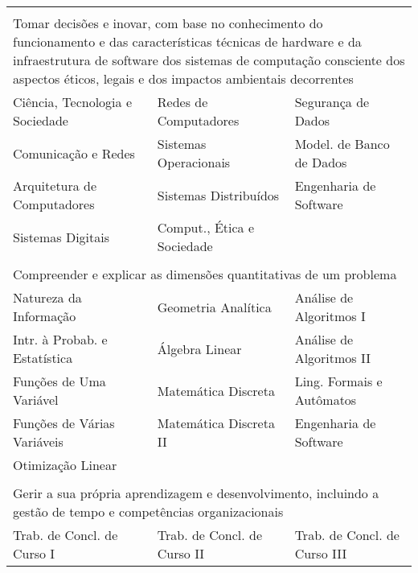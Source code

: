 \begin{longtable}{|p{}p{}p{}|}
    \multicolumn{3}{p{0.95\textwidth}}{}\\

    \multicolumn{3}{p{0.95\textwidth}}{Tomar decisões e inovar, com base no
    conhecimento do funcionamento e das características técnicas de hardware
    e da infraestrutura de software dos sistemas de computação consciente dos
    aspectos éticos, legais e dos impactos ambientais decorrentes}\\
    \hline
    \textcolor{nred}{Ciência, Tecnologia e Sociedade} &
    \textcolor{nblue}{Redes de Computadores} &
    \textcolor{nblue}{Segurança de Dados}\\
    \textcolor{nred}{Comunicação e Redes} &
    \textcolor{nblue}{Sistemas Operacionais} &
    \textcolor{nblue}{\small Model. de Banco de Dados}\\
    \textcolor{nblue}{Arquitetura de Computadores} &
    \textcolor{nblue}{Sistemas Distribuídos} &
    \textcolor{nblue}{Engenharia de Software} \\
    \textcolor{nblue}{Sistemas Digitais} &
    \textcolor{nblue}{Comput., Ética e Sociedade} & \\
    \hline
    
    \multicolumn{3}{p{0.95\textwidth}}{}\\
    \multicolumn{3}{p{0.95\textwidth}}{Compreender e explicar as dimensões quantitativas de um
    problema}\\
    \hline
    \textcolor{nred}{Natureza da Informação} &
    \textcolor{nred}{Geometria Analítica} &
    \textcolor{nblue}{Análise de Algoritmos I} \\
    \textcolor{nred}{Intr. à Probab. e Estatística} &
    \textcolor{nblue}{Álgebra Linear} &
    \textcolor{nblue}{Análise de Algoritmos II} \\
    \textcolor{nred}{Funções de Uma Variável} &
    \textcolor{nblue}{Matemática Discreta} &
    \textcolor{nblue}{Ling. Formais e Autômatos} \\
    \textcolor{nred}{Funções de Várias Variáveis} &
    \textcolor{nblue}{Matemática Discreta II} &
    \textcolor{nblue}{Engenharia de Software}\\
    \textcolor{nblue}{Otimização Linear} & & \\
    \hline
    
    \multicolumn{3}{p{0.95\textwidth}}{}\\
    \multicolumn{3}{p{0.95\textwidth}}{Gerir a sua própria aprendizagem e
    desenvolvimento, incluindo a gestão de tempo e competências
    organizacionais}\\
    \hline
    \textcolor{nblue}{Trab. de Concl. de Curso I} &
    \textcolor{nblue}{Trab. de Concl. de Curso II} &
    \textcolor{nblue}{Trab. de Concl. de Curso III} \\
    \hline
    

\end{longtable}
